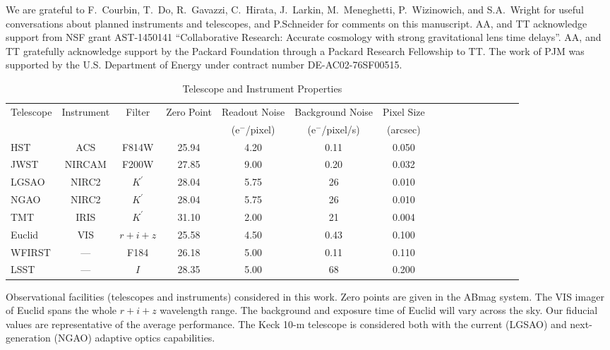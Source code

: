 \documentclass[a4paper,11pt]{article}
\begin{document}
{We are grateful to F.~Courbin, T.~Do, R.~Gavazzi, C.~Hirata,
J.~Larkin, M.~Meneghetti, P.~Wizinowich, and S.A.~Wright for useful
conversations about planned instruments and telescopes, and
P.Schneider for comments on this manuscript. AA, and TT acknowledge
support from NSF grant AST-1450141 ``Collaborative Research: Accurate
cosmology with strong gravitational lens time delays''. AA, and TT
gratefully acknowledge support by the Packard Foundation through a
Packard Research Fellowship to TT.  The work of PJM was supported by
the U.S.  Department of Energy under contract number
DE-AC02-76SF00515.\\





\clearpage
\begin{table}\footnotesize
\begin{center}
\caption{Telescope and Instrument Properties}
\begin{tabular}{lccccccccccccccc|}
\hline \hline
Telescope & Instrument & Filter & Zero Point & Readout Noise & Background Noise & Pixel Size \\
 & & & & (e$^-$/pixel) & (e$^-$/pixel/s) & (arcsec) \\
\hline
  HST    & ACS    &   F814W     &  25.94  & 4.20   &    0.11    &     0.050    \\
  JWST   & NIRCAM &   F200W     &  27.85  & 9.00   &    0.20    &     0.032  \\
  LGSAO  & NIRC2  &   $K^\prime$&  28.04  & 5.75   &      26    &     0.010      \\
  NGAO   & NIRC2  &   $K^\prime$&  28.04  & 5.75   &      26    &     0.010     \\
  TMT    & IRIS   &   $K^\prime$&  31.10  & 2.00   &      21    &     0.004  \\
  Euclid & VIS    &   $r+i+z$   &  25.58  & 4.50   &    0.43    &     0.100   \\
  WFIRST & ---    &   F184      &  26.18  & 5.00   &    0.11    &     0.110   \\
  LSST   & ---    &   $I$       &  28.35  & 5.00   &      68    &     0.200  \\
\hline
\hline
\end{tabular}
\begin{tablenotes}
\item
Observational facilities (telescopes and instruments) considered in this work.
 Zero points are given in the ABmag system. The VIS imager of Euclid spans the whole $r+i+z$ wavelength range. The background and exposure time of Euclid will vary across the sky. Our fiducial values are representative of the average performance. The Keck 10-m telescope is considered both with the current (LGSAO) and next-generation (NGAO) adaptive optics capabilities.\\
\end{tablenotes}
\label{tab:telescopes parameters}
\end{center}
\end{table}



}
\end{document}
